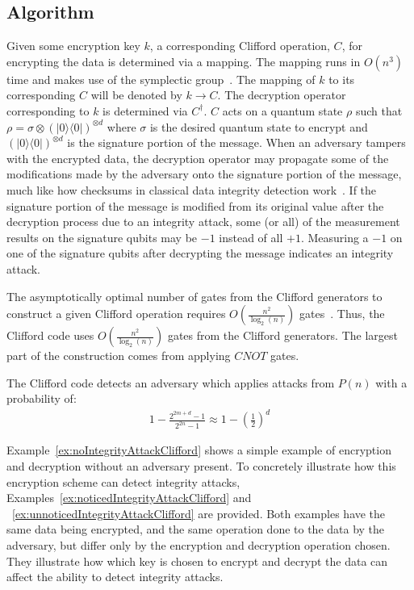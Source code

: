 \subsection{Algorithm}
Given some encryption key $k$, a corresponding Clifford operation, $C$, for encrypting the data is determined via a mapping. The mapping runs in $O \left(n^3 \right)$ time and makes use of the symplectic group~\cite{Koenig2014}. The mapping of $k$ to its corresponding $C$ will be denoted by $k \rightarrow C$. The decryption operator corresponding to $k$ is determined via $C^{\dagger}$. $C$ acts on a quantum state $\rho$ such that $\rho = \sigma \otimes (|0\rangle \langle0|)^{\otimes d}$ where $\sigma$ is the desired quantum state to encrypt and $(|0\rangle \langle0|)^{\otimes d}$ is the signature portion of the message. When an adversary tampers with the encrypted data, the decryption operator may propagate some of the modifications made by the adversary onto the signature portion of the message, much like how checksums in classical data integrity detection work~\cite{checksumWikipedia}. If the signature portion of the message is modified from its original value after the decryption process due to an integrity attack, some (or all) of the measurement results on the signature qubits may be $-1$ instead of all $+1$. Measuring a $-1$ on one of the signature qubits after decrypting the message indicates an integrity attack.

The asymptotically optimal number of gates from the Clifford generators to construct a given Clifford operation requires $O\left(\frac{n^2}{\log_2 (n)} \right)$ gates~\cite{bravyi2021hadamard,patel2008optimal}. Thus, the Clifford code uses $O \left(\frac{n^2}{\log_2(n)} \right)$ gates from the Clifford generators. The largest part of the construction comes from applying $\mathit{CNOT}$ gates.

The Clifford code detects an adversary which applies attacks from $P(n)$ with a probability of:
\begin{align}
1-\frac{2^{2 m+d}-1}{2^{2 n}-1} \approx 1-\left(\frac{1}{2}\right)^{d} \label{eq:CliffordCodeProbabilityOfDetection}
\end{align}

Example~\ref{ex:noIntegrityAttackClifford} shows a simple example of encryption and decryption without an adversary present. To concretely illustrate how this encryption scheme can detect integrity attacks, Examples~\ref{ex:noticedIntegrityAttackClifford} and ~\ref{ex:unnoticedIntegrityAttackClifford} are provided. Both examples have the same data being encrypted, and the same operation done to the data by the adversary, but differ only by the encryption and decryption operation chosen. They illustrate how which key is chosen to encrypt and decrypt the data can affect the ability to detect integrity attacks.

